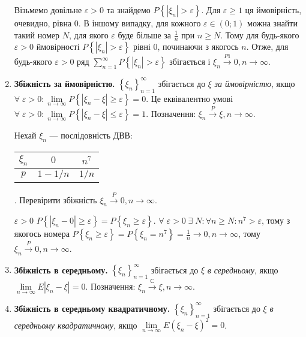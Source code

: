 \begin{enumerate}
\begin{example}
        Візьмемо довільне $\varepsilon > 0$ та знайдемо $P\left\{ |\xi_n| > \varepsilon\right\}$. Для $\varepsilon \geq 1$
        ця ймовірність, очевидно, рівна 0. В іншому випадку, для кожного $\varepsilon \in (0; 1)$ можна знайти такий номер $N$,
        для якого $\varepsilon$ буде більше за $\frac{1}{n}$ при $n \geq N$. Тому для будь-якого $\varepsilon >0$ ймовірності
        $P\left\{ |\xi_n| > \varepsilon\right\}$ рівні 0, починаючи з якогось $n$. Отже, для будь-якого $\varepsilon >0$ ряд 
        $\sum\limits_{n=1}^{\infty} P\left\{\left| \xi_n \right| > \varepsilon\right\}$ збігається і 
        $\xi_n \overset{P1}{\longrightarrow} 0, n \to \infty$.
    \end{example}
    \item \textbf{Збіжність за ймовірністю.}
    \noindent$\left\{ \xi_n\right\}_{n=1}^{\infty}$ збігається до $\xi$ \emph{за ймовірністю}, якщо 
    $\forall \; \varepsilon > 0: \underset{n \to \infty}{\lim} P\left\{|\xi_n - \xi| \geq \varepsilon\right\}= 0$.
    Це еквівалентно умові $\forall \; \varepsilon > 0: \underset{n \to \infty}{\lim} P\left\{|\xi_n - \xi| \leq \varepsilon\right\}= 1$.
    Позначення: $\xi_n \overset{P}{\longrightarrow} \xi, n \to \infty$.
    \begin{example}
        Нехай $\xi_n$ --- послідовність ДВВ: 
        \begin{tabular}{|c|c|c|}
            \hline
            $\xi_n$ & $0$ & $n^7$ \\
            \hline
            $p$ & $1-1/n$ & $1/n$ \\
            \hline
        \end{tabular}.
        Перевірити збіжність $\xi_n \overset{P}{\longrightarrow} 0, n \to \infty$.
        
         $\varepsilon >0$ $P\left\{|\xi_n -0| \geq \varepsilon\right\} = P\left\{ \xi_n \geq \varepsilon\right\}$.
        $\forall \; \varepsilon >0 \; \exists \; N: \forall n\geq N:n^7 > \varepsilon$, тому з якогось номера
        $P\left\{ \xi_n \geq \varepsilon\right\} = P\left\{ \xi_n = n^7 \right\} = \frac{1}{n} \to 0, n\to\infty$, тому $\xi_n \overset{P}{\longrightarrow} 0, n \to \infty$.
    \end{example}
    \item \textbf{Збіжність в середньому.}
    \noindent$\left\{ \xi_n\right\}_{n=1}^{\infty}$ збігається до $\xi$ \emph{в середньому},
    якщо $\underset{n \to \infty}{\lim} E|\xi_n - \xi| = 0$.
    Позначення: $\xi_n \overset{\text{С}}{\longrightarrow} \xi, n \to \infty$.
    \item \textbf{Збіжність в середньому квадратичному.}
    \noindent$\left\{ \xi_n\right\}_{n=1}^{\infty}$ збігається до $\xi$ \emph{в середньому квадратичному},
    якщо $\underset{n \to \infty}{\lim} E(\xi_n - \xi)^2 = 0$.
    

\end{enumerate}
